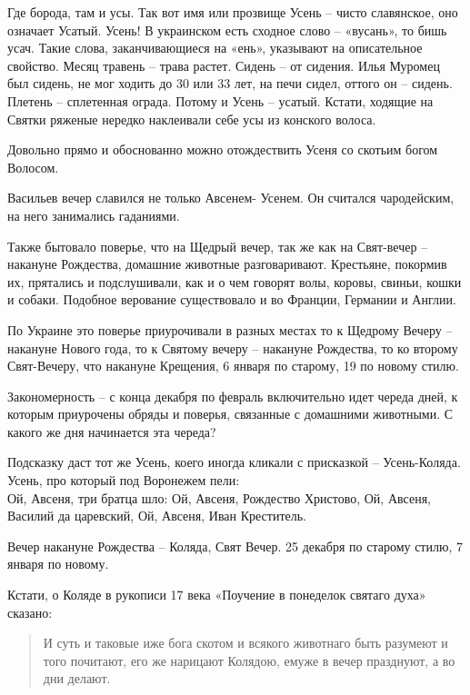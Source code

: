 \documentclass[a5paper,11pt,openany]{article}
\begin{document}
 Где борода, там и усы. Так вот имя или прозвище Усень – чисто славянское, оно означает Усатый. Усень! В украинском есть сходное слово – «вусань», то бишь усач. Такие слова, заканчивающиеся на «ень», указывают на описательное свойство. Месяц травень – трава растет. Сидень – от сидения. Илья Муромец был сидень, не мог ходить до 30 или 33 лет, на печи сидел, оттого он – сидень. Плетень – сплетенная ограда. Потому и Усень – усатый. Кстати, ходящие на Святки ряженые нередко наклеивали себе усы из конского волоса.

   Довольно прямо и обоснованно можно отождествить Усеня со скотьим богом Волосом.

  Васильев вечер славился не только Авсенем- Усенем. Он считался чародейским, на него занимались гаданиями.

  Также бытовало поверье, что на Щедрый вечер, так же как на Свят-вечер – накануне Рождества, домашние животные разговаривают. Крестьяне, покормив их, прятались и подслушивали, как и о чем говорят волы, коровы, свиньи, кошки и собаки. Подобное верование существовало и во Франции, Германии и Англии. 

  По Украине это поверье приурочивали в разных местах то к Щедрому Вечеру – накануне Нового года, то к Святому вечеру – накануне Рождества, то ко второму Свят-Вечеру, что накануне Крещения, 6 января по старому, 19 по новому стилю.

 Закономерность – с конца декабря по февраль включительно идет череда дней, к которым приурочены обряды и поверья, связанные с домашними животными. С какого же дня начинается эта череда?

   Подсказку даст тот же Усень, коего иногда кликали с присказкой – Усень-Коляда. Усень, про который под Воронежем пели:\\ 

\noindent
Ой, Авсеня, три братца шло:\newline
 Ой, Авсеня, Рождество Христово, \newline
Ой, Авсеня, Василий да царевский, \newline
Ой, Авсеня, Иван Креститель.\newline

  Вечер накануне Рождества – Коляда, Свят Вечер. 25 декабря по старому стилю, 7 января по новому. 

   Кстати, о Коляде в рукописи 17 века «Поучение в понеделок святаго духа» сказано:

\begin{quotation}
\noindent И суть и таковые иже бога скотом и всякого животнаго быть разумеют и того почитают, его же нарицают Колядою, емуже в вечер празднуют, а во дни делают.
\end{quotation}
\end{document}
